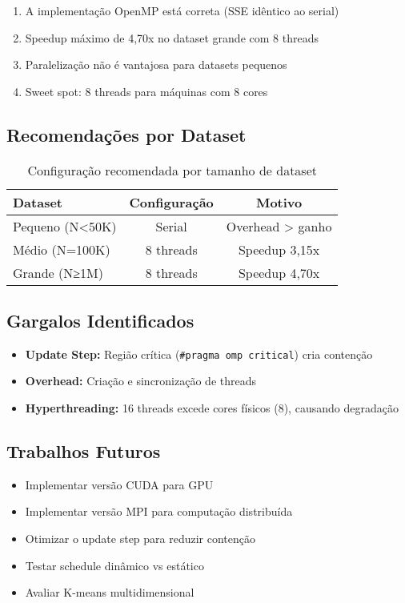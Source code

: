 \documentclass[12pt,a4paper]{article}
\begin{document}
\begin{enumerate}
    \item A implementação OpenMP está correta (SSE idêntico ao serial)
    \item Speedup máximo de 4,70x no dataset grande com 8 threads
    \item Paralelização não é vantajosa para datasets pequenos
    \item Sweet spot: 8 threads para máquinas com 8 cores
\end{enumerate}

\subsection{Recomendações por Dataset}

\begin{table}[H]
\centering
\begin{tabular}{lcc}
\toprule
\textbf{Dataset} & \textbf{Configuração} & \textbf{Motivo} \\
\midrule
Pequeno (N<50K) & Serial & Overhead > ganho \\
Médio (N=100K) & 8 threads & Speedup 3,15x \\
Grande (N≥1M) & 8 threads & Speedup 4,70x \\
\bottomrule
\end{tabular}
\caption{Configuração recomendada por tamanho de dataset}
\end{table}

\subsection{Gargalos Identificados}

\begin{itemize}
    \item \textbf{Update Step:} Região crítica (\texttt{\#pragma omp critical}) cria contenção
    \item \textbf{Overhead:} Criação e sincronização de threads
    \item \textbf{Hyperthreading:} 16 threads excede cores físicos (8), causando degradação
\end{itemize}

\subsection{Trabalhos Futuros}

\begin{itemize}
    \item Implementar versão CUDA para GPU
    \item Implementar versão MPI para computação distribuída
    \item Otimizar o update step para reduzir contenção
    \item Testar schedule dinâmico vs estático
    \item Avaliar K-means multidimensional
\end{itemize}
\end{document}
